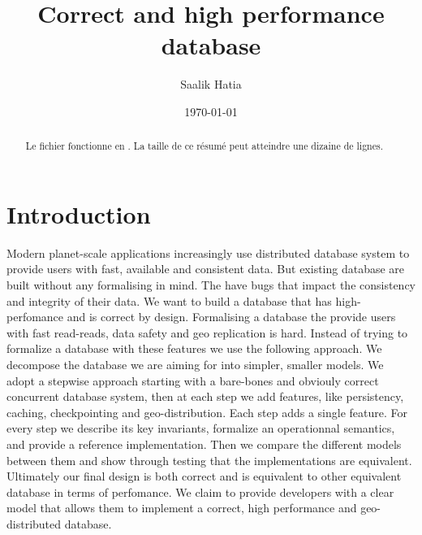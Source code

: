 \documentclass[systeme]{compas2022}
\begin{document}
\title{Correct and high performance database}

\author{Saalik Hatia}%

\address{Université Pierre et Marie Curie\\
Laboratoire LIP6 \\
4, place jussieu\\
75005 Paris - France\\
saalik.hatia@lip6.fr}

\date{\today}

\maketitle

\begin{abstract}
  Le fichier fonctionne en \LaTeXe. La taille
  de ce résumé peut atteindre une dizaine de lignes.
\end{abstract}

\section{Introduction}

Modern planet-scale applications increasingly use distributed database system to provide users with fast, available and consistent data.
But existing database are built without any formalising in mind.
The have bugs that impact the consistency and integrity of their data.
We want to build a database that has high-perfomance and is correct by design.
Formalising a database the provide users with fast read-reads, data safety and geo replication is hard.
Instead of trying to formalize a database with these features we use the following approach.
We decompose the database we are aiming for into simpler, smaller models.
We adopt a stepwise approach starting with a bare-bones and obviouly correct concurrent database system, then at each step we add features, like persistency, caching, checkpointing and geo-distribution. 
Each step adds a single feature.
For every step we describe its key invariants, formalize an operationnal semantics, and provide a reference implementation.
Then we compare the different models between them and show through testing that the implementations are equivalent.
Ultimately our final design is both correct and is equivalent to other equivalent database in terms of perfomance.
We claim to provide developers with a clear model that allows them to implement a correct, high performance and geo-distributed database.
\end{document}

